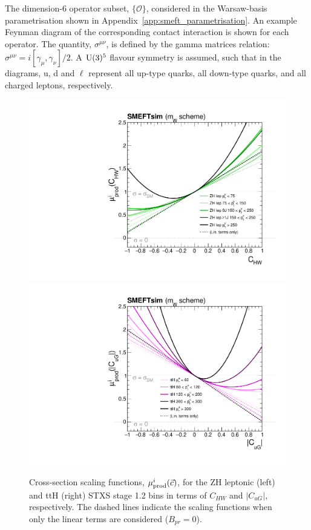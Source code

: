\begin{table}
  \centering
  \scriptsize
  \renewcommand{\arraystretch}{2.3}
  \setlength{\tabcolsep}{3pt}
  \caption[Operator subset in the Warsaw-basis parametrisation]
  {
    The dimension-6 operator subset, $\{\mathcal{O}\}$, considered in the Warsaw-basis parametrisation shown in Appendix~\ref{app:smeft_parametrisation}. An example Feynman diagram of the corresponding contact interaction is shown for each operator. The quantity, $\sigma^{\mu\nu}$, is defined by the gamma matrices relation: $\sigma^{\mu\nu}=i[\gamma_\mu,\gamma_\nu]/2$. A ${\rm{U}}(3)^5$ flavour symmetry is assumed, such that in the diagrams, u, d and $\ell$ represent all up-type quarks, all down-type quarks, and all charged leptons, respectively.
  }
  \label{tab:smeft_operators}
  
\end{table}

\begin{figure}
  \centering
  \includegraphics[width=.48\textwidth]{Figures/eft/scaling_functions/ZH_lep_vs_chw_smeft.pdf}
  \includegraphics[width=.48\textwidth]{Figures/eft/scaling_functions/ttH_vs_cugabs_smeft.pdf}
  \caption[Warsaw-basis cross-section scaling functions for ZH leptonic and ttH STXS stage 1.2 bins]
  {
    Cross-section scaling functions, $\mu_{\rm{prod}}^i(\vec{c})$, for the ZH leptonic (left) and ttH (right) STXS stage 1.2 bins in terms of $C_{HW}$ and $|C_{uG}|$, respectively. The dashed lines indicate the scaling functions when only the linear terms are considered ($B_{pr}=0$).
  }
  \label{fig:smeft_sf_1d}
\end{figure}

